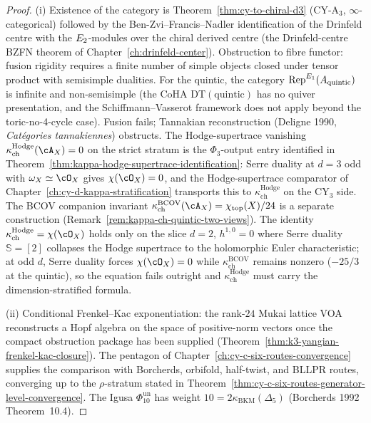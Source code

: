 \begin{proof}
(i) Existence of the category is
Theorem~\ref{thm:cy-to-chiral-d3} (CY-A$_3$, $\infty$-categorical) followed by the
Ben-Zvi--Francis--Nadler identification of the Drinfeld centre with the $E_{2}$-modules
over the chiral derived centre (the Drinfeld-centre BZFN theorem of
Chapter~\ref{ch:drinfeld-center}). Obstruction to fibre functor: fusion rigidity requires
a finite number of simple objects closed under tensor product with semisimple dualities.
For the quintic, the category $\mathrm{Rep}^{E_{1}}(A_{\mathrm{quintic}})$ is infinite
and non-semisimple (the CoHA $\mathrm{DT}(\mathrm{quintic})$ has no quiver presentation,
and the Schiffmann--Vasserot framework does not apply beyond the toric-no-4-cycle case).
Fusion fails; Tannakian reconstruction (Deligne 1990, \emph{Cat\'egories
tannakiennes}) obstructs. The Hodge-supertrace vanishing
$\kappa_{\mathrm{ch}}^{\mathrm{Hodge}}(\cA_X) = 0$ on the strict stratum is the
$\Phi_3$-output entry identified in
Theorem~\ref{thm:kappa-hodge-supertrace-identification}: Serre duality at $d = 3$
odd with $\omega_X \simeq \cO_X$ gives $\chi(\cO_X) = 0$, and the Hodge-supertrace
comparator of Chapter~\ref{ch:cy-d-kappa-stratification} transports this to
$\kappa_{\mathrm{ch}}^{\mathrm{Hodge}}$ on the CY$_3$ side. The BCOV companion
invariant $\kappa_{\mathrm{ch}}^{\mathrm{BCOV}}(\cA_X) = \chi_{\mathrm{top}}(X)/24$
is a separate construction (Remark~\ref{rem:kappa-ch-quintic-two-views}).
The identity $\kappa_{\mathrm{ch}}^{\mathrm{Hodge}} = \chi(\cO_X)$ holds only on the slice
$d = 2$, $h^{1,0} = 0$ where Serre duality $\mathbb S = [2]$ collapses the
Hodge supertrace to the holomorphic Euler characteristic; at odd $d$,
Serre duality forces $\chi(\cO_X) = 0$ while $\kappa_{\mathrm{ch}}^{\mathrm{BCOV}}$
remains nonzero ($-25/3$ at the quintic), so the equation fails outright
and $\kappa_{\mathrm{ch}}^{\mathrm{Hodge}}$ must carry the dimension-stratified formula.

(ii) Conditional Frenkel--Kac exponentiation: the rank-$24$ Mukai
lattice VOA reconstructs a Hopf algebra on the space of positive-norm
vectors once the compact obstruction package has been supplied
(Theorem~\ref{thm:k3-yangian-frenkel-kac-closure}).
The pentagon of Chapter~\ref{ch:cy-c-six-routes-convergence} supplies the comparison with
Borcherds, orbifold, half-twist, and BLLPR routes, converging up to the $\rho$-stratum
stated in Theorem~\ref{thm:cy-c-six-routes-generator-level-convergence}. The Igusa
\(\Phi_{10}^{\mathrm{un}}\) has weight \(10=2\kappa_{\mathrm{BKM}}(\Delta_5)\)
(Borcherds 1992 Theorem~10.4).


\end{proof}
